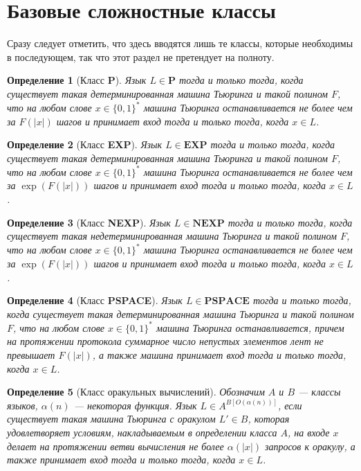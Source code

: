 \documentclass[14pt, a4paper]{extreport}
\newtheorem{definition}{\indent Определение}
\newcommand{\word}{\{0, 1\}^*}
\begin{document}
\section{Базовые сложностные классы}
Сразу следует отметить, что здесь вводятся лишь те классы, которые необходимы в последующем, так что этот раздел не претендует на полноту.
\begin{definition}[Класс \textbf{P}]Язык $L \in \textbf{P}$ тогда и только тогда, когда существует такая детерминированная машина Тьюринга и такой полином $F$, что на любом слове $x \in \word$ машина Тьюринга останавливается не более чем за $F(|x|)$ шагов и принимает вход тогда и только тогда, когда $x \in L$.
\end{definition}
\begin{definition}[Класс \textbf{EXP}]Язык $L \in \textbf{EXP}$ тогда и только тогда, когда существует такая детерминированная машина Тьюринга и такой полином $F$, что на любом слове $x \in \word$ машина Тьюринга останавливается не более чем за $\exp\left(F(|x|)\right)$ шагов и принимает вход тогда и только тогда, когда $x \in L$.
\end{definition}
\begin{definition}[Класс \textbf{NEXP}]Язык $L \in \textbf{NEXP}$ тогда и только тогда, когда существует такая недетерминированная машина Тьюринга и такой полином $F$, что на любом слове $x \in \word$ машина Тьюринга останавливается не более чем за $\exp\left(F(|x|)\right)$ шагов и принимает вход тогда и только тогда, когда $x \in L$.
\end{definition}
\begin{definition}[Класс \textbf{PSPACE}]Язык $L \in \textbf{PSPACE}$ тогда и только тогда, когда существует такая детерминированная машина Тьюринга и такой полином $F$, что на любом слове $x \in \word$ машина Тьюринга останавливается, причем на протяжении протокола суммарное число непустых элементов лент не превышает $F(|x|)$, а также машина принимает вход тогда и только тогда, когда $x \in L$.
\end{definition}
\begin{definition}[Класс оракульных вычислений]Обозначим $A$ и $B$ --- классы языков, $\alpha(n)$ --- некоторая функция. Язык $L \in A^{B\left[O(\alpha(n))\right]}$, если существует такая машина Тьюринга с оракулом $L' \in B$, которая удовлетворяет условиям, накладываемым в определении класса $A$, на входе $x$ делает на протяжении ветви вычисления не более $\alpha(|x|)$ запросов к оракулу, а также принимает вход тогда и только тогда, когда $x \in L$.
\end{definition}
\end{document}
